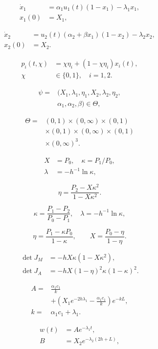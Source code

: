 \[
\begin{aligned}\dot x_1&=\alpha_1u_1(t)(1-x_1)-\lambda_1x_1,\\x_1(0)&=X_1,\end{aligned}
\]

\[
\begin{aligned}\dot x_2&=u_2(t)(\alpha_2+\beta x_1)(1-x_2)-\lambda_2x_2,\\x_2(0)&=X_2.\end{aligned}
\]

\[
\begin{aligned}p_i(t,χ)&=χ\eta_i+(1-χ\eta_i)x_i(t),\\χ&\in\{0,1\},\quad i=1,2.\end{aligned}
\]

\[
\begin{aligned}\psi=&(X_1,\lambda_1,\eta_1,X_2,\lambda_2,\eta_2,\\&\alpha_1,\alpha_2,\beta)\in\Theta,\end{aligned}
\]

\[
\begin{aligned}\Theta=&(0,1)\times(0,\infty)\times(0,1)\\&\times(0,1)\times(0,\infty)\times(0,1)\\&\times(0,\infty)^3.\end{aligned}
\]

\[
\begin{aligned}X&=P_0,\quad κ=P_1/P_0,\\\lambda&=-h^{-1}\ln κ,\end{aligned}
\]

\[
\eta=\frac{P_2-Xκ^2}{1-Xκ^2}.
\]

\[
κ=\frac{P_1-P_2}{P_0-P_1},\quad\lambda=-h^{-1}\ln κ,
\]

\[
\eta=\frac{P_1-κP_0}{1-κ},\qquad X=\frac{P_0-\eta}{1-\eta}.
\]

\[
\begin{aligned}\det J_M&=-hXκ(1-Xκ^2),\\\det J_A&=-hX(1-\eta)^2κ(1-κ)^2.\end{aligned}
\]

\[
\begin{aligned}A=&\frac{\alpha_1c_1}{k}\\&+\left(X_1e^{-2h\lambda_1}-\frac{\alpha_1c_1}{k}\right)e^{-kL},\\k=&\alpha_1c_1+\lambda_1.\end{aligned}
\]

\[
\begin{aligned}w(t)&=Ae^{-\lambda_1t},\\B&=X_2e^{-\lambda_2(2h+L)},\end{aligned}
\]

